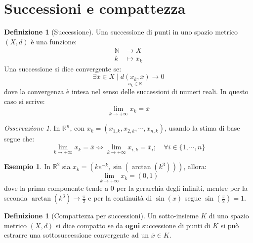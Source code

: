 \documentclass[11pt, a4paper, openright]{book}
\theoremstyle{plain}
\theoremstyle{definition}
\newtheorem{definizione}[teorema]{Definizione}
\newtheorem{esempio}[teorema]{Esempio}
\theoremstyle{remark}
\newtheorem{osservazione}[teorema]{Osservazione}
\begin{document}
\section{Successioni e compattezza}
\begin{definizione}[Successione]
    Una successione di punti in uno spazio metrico $(X, d)$ è una funzione:
    \begin{equation}
        \begin{aligned}
            \mathbb{N} &\longrightarrow X \\
            k &\longmapsto x_k
        \end{aligned}
    \end{equation}
    Una successione si dice convergente se:
    \begin{equation}
        \exists \bar{x} \in X \mid \underset{a_k \in \mathbb{R}}{d(x_k, \bar{x})} \longrightarrow 0
    \end{equation}
    dove la convergenza è intesa nel senso delle successioni di numeri reali. In questo caso si scrive:
    \begin{equation}
        \lim_{k \to +\infty} x_k = \bar{x}
    \end{equation}
\end{definizione}

\begin{osservazione}
    In $\mathbb{R}^n$, con $x_k = (x_{1, k}, x_{2, k}, \cdots, x_{n, k})$, usando la stima di base segue che:
    \begin{equation}
        \lim_{k \to +\infty} x_k = \bar{x} \iff \lim_{k \to +\infty} x_{i, k} = \bar{x}_i; \quad \forall i \in \{1, \cdots, n\}
    \end{equation}
\end{osservazione}

\begin{esempio}
    In $\mathbb{R}^2$ sia $x_k = \left(k e^{-k}, \sin(\arctan(k^3))\right)$, allora:
    \begin{equation}
        \lim_{k \to +\infty} x_k = (0, 1)
    \end{equation}
    dove la prima componente tende a $0$ per la gerarchia degli infiniti, mentre per la seconda $\arctan(k^3) \longrightarrow \frac{\pi}{2}$ e per la continuità di $\sin(x)$ segue $\sin\left(\frac{\pi}{2}\right) = 1$.
\end{esempio}

\begin{definizione}[Compattezza per successioni]
    Un sotto-insieme $K$ di uno spazio metrico $(X, d)$ si dice compatto se da \textbf{ogni} successione di punti di $K$ si può estrarre una sottosuccessione convergente ad un $\bar{x} \in K$.
\end{definizione}
\end{document}
